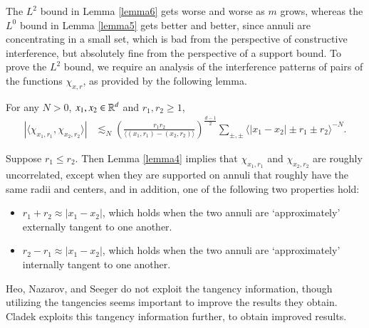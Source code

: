 The $L^2$ bound in Lemma \ref{lemma6} gets worse and worse as $m$ grows, whereas the $L^0$ bound in Lemma \ref{lemma5} gets better and better, since annuli are concentrating in a small set, which is bad from the perspective of constructive interference, but absolutely fine from the perspective of a support bound. To prove the $L^2$ bound, we require an analysis of the interference patterns of pairs of the functions $\chi_{x,r}$, as provided by the following lemma.

%
%
%
%

\begin{lemma} \label{lemma4}
    For any $N > 0$, $x_1,x_2 \in \operatorname{\mathbb{R}}^d$ and $r_1,r_2 \geq 1$,
    \begin{align*}
        |\langle \chi_{x_1,r_1}, \chi_{x_2,r_2} \rangle| &\lesssim_N \left( \frac{r_1r_2}{\langle (x_1,r_1) - (x_2,r_2) \rangle} \right)^{\frac{d-1}{2}} \sum\nolimits_{\pm,\pm} \langle |x_1 - x_2| \pm r_1 \pm r_2 \rangle^{-N}.
    \end{align*}
\end{lemma}

\begin{remark}
    Suppose $r_1 \leq r_2$. Then Lemma \ref{lemma4} implies that $\chi_{x_1,r_1}$ and $\chi_{x_2,r_2}$ are roughly uncorrelated, except when they are supported on annuli that roughly have the same radii and centers, and in addition, one of the following two properties hold:
    \begin{itemize}
        \item $r_1 + r_2 \approx |x_1 - x_2|$, which holds when the two annuli are `approximately' externally tangent to one another.

        \item $r_2 - r_1 \approx |x_1 - x_2|$, which holds when the two annuli are `approximately' internally tangent to one another.
    \end{itemize}
    Heo, Nazarov, and Seeger do not exploit the tangency information, though utilizing the tangencies seems important to improve the results they obtain. Cladek exploits this tangency information further, to obtain improved results.
\end{remark}

